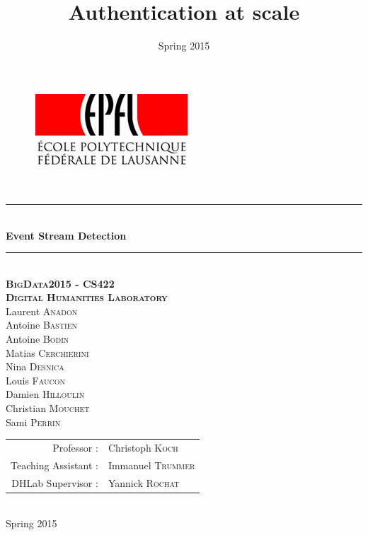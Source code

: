 \documentclass[a4paper, 11pt]{article}
\title{Authentication at scale}
\author{ }
\date{Spring 2015}
\newcommand{\HRule}{\rule{\linewidth}{0.5mm}}
\begin{document}

\begin{titlepage}
\begin{center}

\begin{figure}[h] 
\begin{center}
\begin{minipage}[c]{.45\linewidth}
\begin{center}
\includegraphics[scale=1]{images/logoEPFL.png}
\end{center}
\end{minipage}
\end{center}
\end{figure}

\hfill \\[2cm]
\HRule \\[0.5cm]
{ \Huge \bfseries Event Stream Detection}\\[0.5cm]

\HRule \\[2cm]
\makeatletter
\renewcommand{\thesection}{\@arabic\c@section}
\makeatother
\textsc{\textbf{\Large BigData2015 - CS422\\ Digital Humanities Laboratory}}\\[2cm]


\large Laurent \textsc{Anadon}\\
\large Antoine \textsc{Bastien}\\
\large Antoine \textsc{Bodin}\\
\large Matias \textsc{Cerchierini}\\
\large Nina \textsc{Desnica}\\
\large Louis \textsc{Faucon}\\
\large Damien \textsc{Hilloulin}\\
\large Christian \textsc{Mouchet}\\
\large Sami \textsc{Perrin}\\[2cm]


\begin{tabular}{rl}
Professor : &Christoph \textsc{Koch}\\
Teaching Assistant : &Immanuel \textsc{Trummer}\\
DHLab Supervisor : &Yannick \textsc{Rochat}
\end{tabular}

\hfill \\[1cm]
{\large Spring 2015}
\end{center}
\end{titlepage}
\end{document}

